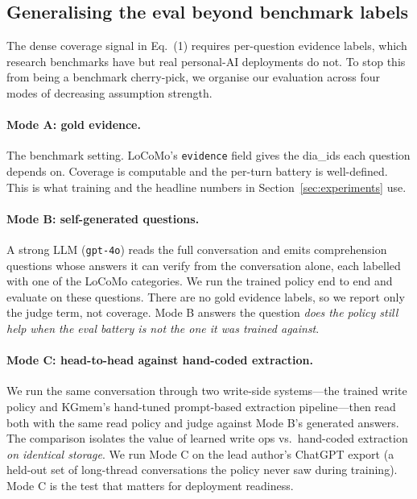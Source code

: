 \documentclass[11pt]{article}
\begin{document}
\subsection{Generalising the eval beyond benchmark labels}
\label{sec:eval-modes}

The dense coverage signal in Eq.~(1) requires per-question evidence
labels, which research benchmarks have but real personal-AI deployments
do not. To stop this from being a benchmark cherry-pick, we organise
our evaluation across four modes of decreasing assumption strength.

\paragraph{Mode A: gold evidence.} The benchmark setting. LoCoMo's
\texttt{evidence} field gives the dia\_ids each question depends on.
Coverage is computable and the per-turn battery is well-defined. This
is what training and the headline numbers in Section~\ref{sec:experiments}
use.

\paragraph{Mode B: self-generated questions.} A strong LLM
(\texttt{gpt-4o}) reads the full conversation and emits comprehension
questions whose answers it can verify from the conversation alone, each
labelled with one of the LoCoMo categories. We run the trained policy
end to end and evaluate on these questions. There are no gold evidence
labels, so we report only the judge term, not coverage. Mode B answers
the question \emph{does the policy still help when the eval battery is
not the one it was trained against}.

\paragraph{Mode C: head-to-head against hand-coded extraction.} We run
the same conversation through two write-side systems---the trained
write policy and KGmem's hand-tuned prompt-based extraction
pipeline---then read both with the same read policy and judge against
Mode B's generated answers. The comparison isolates the value of
learned write ops vs.\ hand-coded extraction \emph{on identical
storage}. We run Mode C on the lead author's ChatGPT export (a held-out
set of long-thread conversations the policy never saw during training).
Mode C is the test that matters for deployment readiness.
\end{document}
